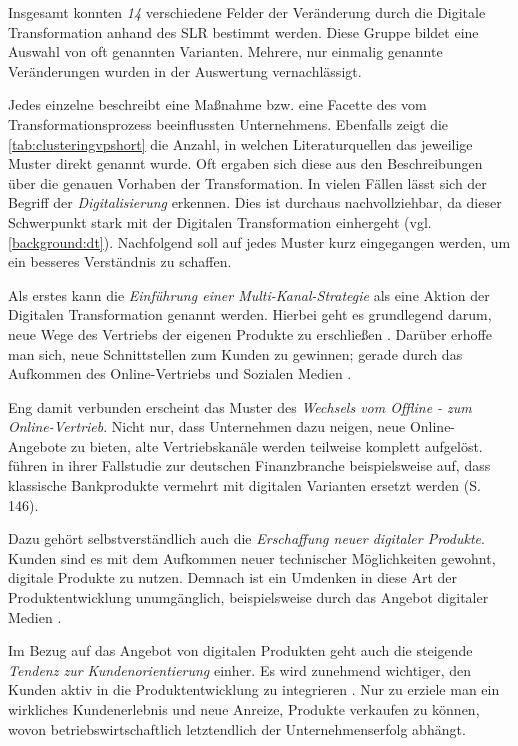 Insgesamt konnten \textit{14} verschiedene Felder der Veränderung durch die Digitale Transformation anhand des SLR bestimmt werden. Diese Gruppe bildet eine Auswahl von oft genannten Varianten. Mehrere, nur einmalig genannte  Veränderungen wurden in der Auswertung vernachlässigt.

Jedes einzelne beschreibt eine Maßnahme bzw. eine Facette des vom Transformationsprozess beeinflussten Unternehmens.  Ebenfalls zeigt die \ref{tab:clusteringvpshort} die Anzahl, in welchen Literaturquellen das jeweilige Muster direkt genannt wurde. Oft ergaben sich diese aus den Beschreibungen über die genauen Vorhaben der Transformation. 
In vielen Fällen lässt sich der Begriff der \textit{Digitalisierung} erkennen. Dies ist durchaus nachvollziehbar, da dieser Schwerpunkt stark mit der Digitalen Transformation einhergeht (vgl. \ref{background:dt}). Nachfolgend soll auf jedes Muster kurz eingegangen werden, um ein besseres Verständnis zu schaffen.


Als erstes kann die \textit{Einführung einer Multi-Kanal-Strategie} als eine Aktion der Digitalen Transformation genannt werden. Hierbei geht es grundlegend darum, neue  Wege des Vertriebs der eigenen Produkte zu erschließen \cite[S. 242]{muchna_aspekte_2018}. Darüber erhoffe man sich, neue Schnittstellen zum Kunden zu gewinnen; gerade durch das Aufkommen des Online-Vertriebs und Sozialen Medien \cite[S. 21]{solis_2017_2017}.

Eng damit verbunden erscheint das Muster des \textit{Wechsels vom Offline - zum Online-Vertrieb}. Nicht nur, dass Unternehmen dazu neigen, neue Online-Angebote zu bieten, alte Vertriebskanäle werden teilweise komplett aufgelöst.  führen in ihrer Fallstudie zur deutschen Finanzbranche beispielsweise auf, dass klassische Bankprodukte vermehrt  mit digitalen Varianten ersetzt werden (S. 146).

Dazu gehört selbstverständlich auch die \textit{Erschaffung neuer digitaler Produkte}. Kunden sind es mit dem Aufkommen neuer technischer Möglichkeiten gewohnt, digitale Produkte zu nutzen. Demnach ist ein Umdenken in diese Art der Produktentwicklung unumgänglich, beispielsweise durch das Angebot digitaler Medien \cite[S. 303]{heinemann_digitale_2016}. 

Im Bezug auf das Angebot von digitalen Produkten geht auch die steigende \textit{Tendenz zur Kundenorientierung} einher. Es wird zunehmend wichtiger, den Kunden aktiv in die Produktentwicklung zu integrieren \cite[S. 17]{depiereux_studie_2018}. Nur zu erziele man ein wirkliches Kundenerlebnis und neue Anreize, Produkte verkaufen zu können, wovon betriebswirtschaftlich letztendlich der Unternehmenserfolg abhängt.

